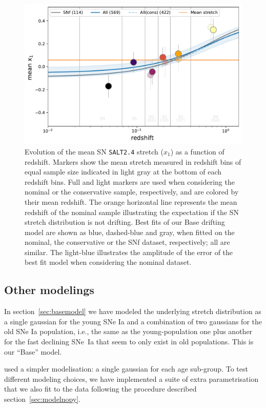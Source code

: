 \documentclass[]{aa} %
\newcommand{\nn}[1]{{\textcolor[rgb]{1, 0.27, 0}{#1}}}
\begin{document}
\begin{figure}
    \centering
    \includegraphics[width=0.7\linewidth]{Article_figures/stretchevol_all_vs_snf.pdf}
    \caption{Evolution of the mean SN \textsc{\texttt{SALT2.4}} stretch ($x_1$)
        as a function of redshift. Markers show the mean stretch measured in
        redshift bins of equal sample size indicated in light gray at the bottom
        of each redshift bins. Full and light markers are used when considering
        the nominal or the conservative sample, respectively, and are colored by
        their mean redshift. The orange horizontal line represents the mean
        redshift of the nominal sample illustrating the expectation if the SN
        stretch distribution is not drifting. Best fits of our Base drifting
        model are shown as blue, dashed-blue and gray, when fitted on the
    nominal, the conservative or the SNf dataset, respectively; all are similar.
The light-blue illustrates the amplitude of the error of the best fit model when
considering the nominal dataset.}
    \label{fig:modelall}
\end{figure}

\subsection{Other modelings}
\label{sec:othermodel}

In section~\nn{\ref{sec:basemodel}} we have modeled the underlying stretch
distribution as a single gaussian for the young SNe Ia and a combination of two
gaussians for the old SNe Ia population, i.e., the same as the young-population
one plus another for the fast declining SNe~Ia that seem to only exist in old
populations. This is our “Base” model.

\cite{howell2007} used a simpler modelisation: a single gaussian for each age
sub-group. To test \nn{different modeling choices}, we have implemented a suite
of extra parametrisation that we also fit to the data following the procedure
described section~\ref{sec:modelnopy}. 
\end{document}
